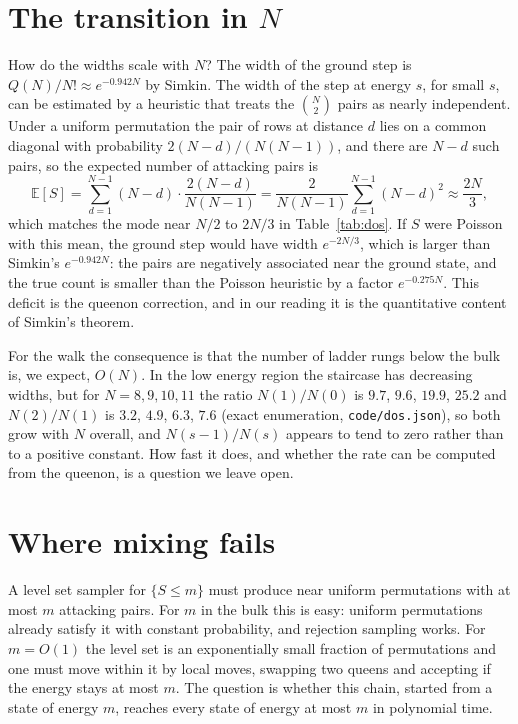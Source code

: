 \documentclass[11pt,twoside,openany]{book}
\theoremstyle{plain}
\theoremstyle{definition}
\theoremstyle{remark}
\newcommand{\EE}{\mathbb{E}}
\begin{document}
\section{The transition in $N$}

How do the widths scale with $N$? The width of the ground step is $Q(N) / N! \approx e^{-0.942 N}$ by Simkin. The width of the step at energy $s$, for small $s$, can be estimated by a heuristic that treats the $\binom{N}{2}$ pairs as nearly independent. Under a uniform permutation the pair of rows at distance $d$ lies on a common diagonal with probability $2(N - d) / (N(N-1))$, and there are $N - d$ such pairs, so the expected number of attacking pairs is
\[
\EE[S] = \sum_{d=1}^{N-1} (N - d) \cdot \frac{2 (N - d)}{N (N - 1)} = \frac{2}{N(N-1)} \sum_{d=1}^{N-1} (N-d)^2 \approx \frac{2N}{3} ,
\]
which matches the mode near $N/2$ to $2N/3$ in Table~\ref{tab:dos}. If $S$ were Poisson with this mean, the ground step would have width $e^{-2N/3}$, which is larger than Simkin's $e^{-0.942 N}$: the pairs are negatively associated near the ground state, and the true count is smaller than the Poisson heuristic by a factor $e^{-0.275 N}$. This deficit is the queenon correction, and in our reading it is the quantitative content of Simkin's theorem.

For the walk the consequence is that the number of ladder rungs below the bulk is, we expect, $O(N)$. In the low energy region the staircase has decreasing widths, but for $N = 8, 9, 10, 11$ the ratio $N(1)/N(0)$ is $9.7$, $9.6$, $19.9$, $25.2$ and $N(2)/N(1)$ is $3.2$, $4.9$, $6.3$, $7.6$ (exact enumeration, \texttt{code/dos.json}), so both grow with $N$ overall, and $N(s-1)/N(s)$ appears to tend to zero rather than to a positive constant. How fast it does, and whether the rate can be computed from the queenon, is a question we leave open.

\section{Where mixing fails}

A level set sampler for $\{ S \le m \}$ must produce near uniform permutations with at most $m$ attacking pairs. For $m$ in the bulk this is easy: uniform permutations already satisfy it with constant probability, and rejection sampling works. For $m = O(1)$ the level set is an exponentially small fraction of permutations and one must move within it by local moves, swapping two queens and accepting if the energy stays at most $m$. The question is whether this chain, started from a state of energy $m$, reaches every state of energy at most $m$ in polynomial time.
\end{document}

